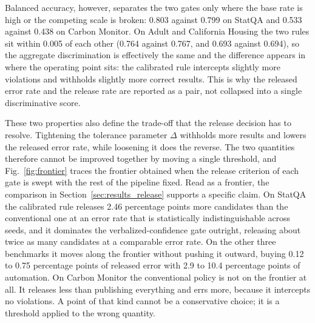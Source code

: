 \documentclass[preprint,12pt,authoryear]{elsarticle}
\begin{document}
Balanced accuracy, however, separates the two gates only where the base rate is high or the competing scale is broken: 0.803 against 0.799 on StatQA and 0.533 against 0.438 on Carbon Monitor.
On Adult and California Housing the two rules sit within 0.005 of each other (0.764 against 0.767, and 0.693 against 0.694), so the aggregate discrimination is effectively the same and the difference appears in where the operating point sits: the calibrated rule intercepts slightly more violations and withholds slightly more correct results.
This is why the released error rate and the release rate are reported as a pair, not collapsed into a single discriminative score.

These two properties also define the trade-off that the release decision has to resolve.
Tightening the tolerance parameter $\Delta$ withholds more results and lowers the released error rate, while loosening it does the reverse.
The two quantities therefore cannot be improved together by moving a single threshold, and Fig.~\ref{fig:frontier} traces the frontier obtained when the release criterion of each gate is swept with the rest of the pipeline fixed.
Read as a frontier, the comparison in Section~\ref{sec:results_release} supports a specific claim.
On StatQA the calibrated rule releases 2.46 percentage points more candidates than the conventional one at an error rate that is statistically indistinguishable across seeds, and it dominates the verbalized-confidence gate outright, releasing about twice as many candidates at a comparable error rate.
On the other three benchmarks it moves along the frontier without pushing it outward, buying 0.12 to 0.75 percentage points of released error with 2.9 to 10.4 percentage points of automation.
On Carbon Monitor the conventional policy is not on the frontier at all. It releases less than publishing everything and errs more, because it intercepts no violations.
A point of that kind cannot be a conservative choice; it is a threshold applied to the wrong quantity.
\end{document}
